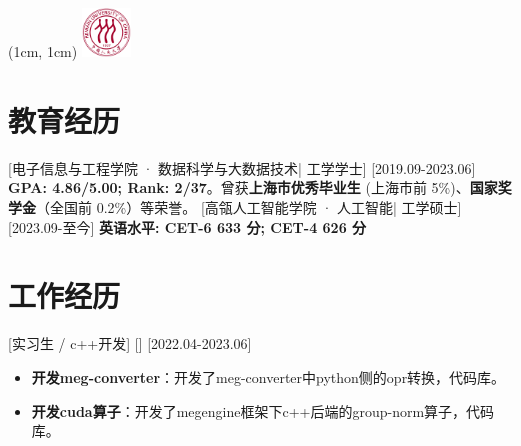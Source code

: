 \documentclass{resume}
\begin{document}
\begin{textblock*}{2cm}(1cm, 1cm)
  {\includegraphics[height=1.3cm]{figure/ruc_uni_logo.png}}
\end{textblock*}


\ResumeTitle


\section{教育经历}
[\textnormal{电子信息与工程学院 · 数据科学与大数据技术|} 工学学士]
[2019.09-2023.06]
\textbf{GPA: 4.86/5.00; Rank: 2/37}。曾获\textbf{上海市优秀毕业生} (上海市前 5\%)、\textbf{国家奖学金}（全国前 0.2\%）等荣誉。
[\textnormal{高瓴人工智能学院 · 人工智能|} 工学硕士]
[2023.09-至今]
\textbf{英语水平: CET-6 633 分; CET-4 626 分}

\section{工作经历}

[实习生 / c++开发]
[]
[2022.04-2023.06]
\begin{itemize}
  \item \textbf{开发meg-converter}：开发了meg-converter中python侧的opr转换，代码库。
  \item \textbf{开发cuda算子}：开发了megengine框架下c++后端的group-norm算子，代码库。
\end{itemize}
\end{document}

